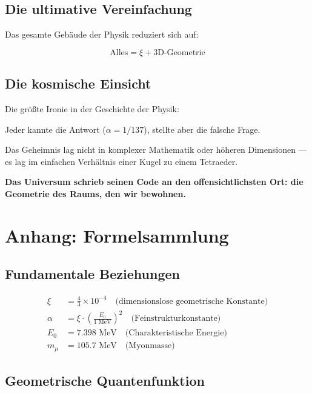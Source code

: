 	\subsection{Die ultimative Vereinfachung}
	
	Das gesamte Gebäude der Physik reduziert sich auf:
	
	\begin{equation}
		\boxed{\text{Alles} = \xi + \text{3D-Geometrie}}
	\end{equation}
	
	\subsection{Die kosmische Einsicht}
	
	\begin{tcolorbox}[colback=red!5!white,colframe=red!75!black,title=Erkenntnis]
		Die größte Ironie in der Geschichte der Physik:
		
		Jeder kannte die Antwort ($\alpha = 1/137$), stellte aber die falsche Frage.
		
		Das Geheimnis lag nicht in komplexer Mathematik oder höheren Dimensionen — es lag im einfachen Verhältnis einer Kugel zu einem Tetraeder.
		
		\textbf{Das Universum schrieb seinen Code an den offensichtlichsten Ort: die Geometrie des Raums, den wir bewohnen.}
	\end{tcolorbox}
	
	\section{Anhang: Formelsammlung}
	
	\subsection{Fundamentale Beziehungen}
	
	\begin{align}
		\xi &= \frac{4}{3} \times 10^{-4} \quad \text{(dimensionslose geometrische Konstante)}\\
		\alpha &= \xi \cdot \left(\frac{E_0}{1 \text{ MeV}}\right)^2 \quad \text{(Feinstrukturkonstante)}\\
		E_0 &= 7.398 \text{ MeV} \quad \text{(Charakteristische Energie)}\\
		m_\mu &= 105.7 \text{ MeV} \quad \text{(Myonmasse)}
	\end{align}
	
	\subsection{Geometrische Quantenfunktion}
	
